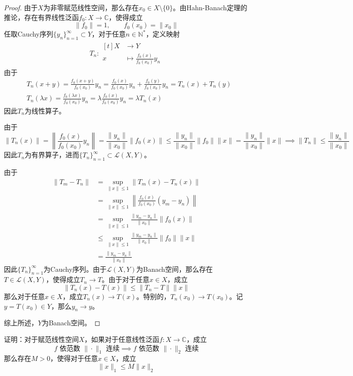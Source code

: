 \documentclass[lang = cn, scheme = chinese, 10pt]{elegantbook}
\newcommand{\N}{\mathbb{N}}  %
\newcommand{\C}{\mathbb{C}}  %
\newcommand{\sub}{\subset}   %
\begin{document}
\begin{proof}
	由于$X$为非零赋范线性空间，那么存在$x_0\in X\setminus\{0\}$。由Hahn-Banach定理的推论，存在有界线性泛函$f_0:X\to \C$，使得成立
	$$
	\|f_0\|=1,\qquad f_0(x_0)=\|x_0\|
	$$
	任取Cauchy序列$\{y_n\}_{n=1}^{\infty}\sub Y$，对于任意$n\in\N^*$，定义映射
	\begin{align*}
		T_n:\begin{aligned}[t]
			X &\longrightarrow Y\\
			x &\longmapsto \frac{f_0(x)}{f_0(x_0)}y_n
		\end{aligned}
	\end{align*}
	由于
	\begin{align*}
		& T_n(x+y)
		=\frac{f_0(x+y)}{f_0(x_0)}y_n
		=\frac{f_0(x)}{f_0(x_0)}y_n+\frac{f_0(y)}{f_0(x_0)}y_n
		=T_n(x)+T_n(y)\\
		& T_n(\lambda x)
		=\frac{f_0(\lambda x)}{f_0(x_0)}y_n
		= \lambda \frac{f_0(x)}{f_0(x_0)}y_n
		=\lambda T_n(x)
	\end{align*}
	因此$T_n$为线性算子。
	
	由于
	$$
	\|T_n(x)\|
	=\left\| \frac{f_0(x)}{f_0(x_0)}y_n \right\|
	=\frac{\|y_n\|}{\|x_0\|}\|f_0(x)\|
	\le \frac{\|y_n\|}{\|x_0\|}\|f_0\|\|x\|
	= \frac{\|y_n\|}{\|x_0\|}\|x\|
	\implies 
	\|T_n\|\le \frac{\|y_n\|}{\|x_0\|}
	$$
	因此$T_n$为有界算子，进而$\{T_n\}_{n=1}^{\infty}\sub \mathcal{L}(X,Y)$。
	
	由于
	\begin{align*}
		\|T_m-T_n\|
		& = \sup_{\|x\|\le 1}\|T_m(x)-T_n(x)\|\\
		& = \sup_{\|x\|\le 1}\left\| \frac{f_0(x)}{f_0(x_0)}(y_m-y_n) \right\|\\
		& = \sup_{\|x\|\le 1}\frac{\|y_m-y_n\|}{\|x_0\|}\|f_0(x)\|\\
		& \le \sup_{\|x\|\le 1}\frac{\|y_m-y_n\|}{\|x_0\|}\|f_0\|\|x\|\\
		& = \frac{\|y_m-y_n\|}{\|x_0\|}
	\end{align*}
	因此$\{T_n\}_{n=1}^{\infty}$为Cauchy序列。由于$\mathcal{L}(X,Y)$为Banach空间，那么存在$T\in \mathcal{L}(X,Y)$，使得成立$T_n\to T$。由于对于任意$x\in X$​，成立
	$$
	\|T_n(x)-T(x)\|\le \|T_n-T\|\|x\|
	$$
	那么对于任意$x\in X$，成立$T_n(x)\to T(x)$。特别的，$T_n(x_0)\to T(x_0)$。记$y=T(x_0)\in Y$，那么$y_n\to y$。
	
	综上所述，$Y$为Banach空间。
\end{proof}

\begin{proposition}
	证明：对于赋范线性空间$X$，如果对于任意线性泛函$f:X\to \C$，成立
	$$
	f\text{ 依范数 }\|\cdot\|_1\text{ 连续}
	\implies
	f\text{ 依范数 }\|\cdot\|_2\text{ 连续}
	$$
	那么存在$M>0$，使得对于任意$x\in X$，成立
	$$
	\|x\|_1\le M\|x\|_2
	$$
\end{proposition}
\end{document}
